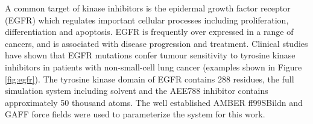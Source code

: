 A common target of kinase inhibitors is the epidermal growth factor receptor (EGFR) which regulates important cellular processes including proliferation, differentiation and apoptosis.
EGFR is frequently over expressed in a range of cancers, and is associated with disease progression and treatment. 
Clinical studies have shown that EGFR mutations confer tumour sensitivity to tyrosine kinase inhibitors in patients with non-small-cell lung cancer (examples shown in Figure \ref{fig:egfr}).
The tyrosine kinase domain of EGFR contains 288 residues, the full simulation system including solvent and the AEE788 inhibitor contains approximately 50 thousand atoms.
The well established AMBER ff99SBildn and GAFF force fields \cite{Maier2015, Wang2004} were used to parameterize the system for this work.
